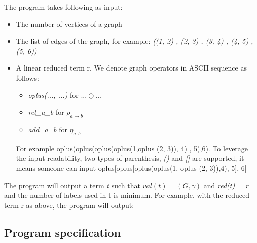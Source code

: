 \documentclass[a4paper, 12pt]{article}
\begin{document}
The program takes following as input: 
\begin{itemize}
\item The number of vertices of a graph
\item The list of edges of the graph, for example: \textit {((1, 2) , (2, 3) , (3, 4) , (4, 5) , (5, 6))}
\item A linear reduced term r. We denote graph operators in ASCII sequence as follows:
\begin{itemize}
\item \textit {oplus(..., ...)} for $...\oplus...$
\item \textit {rel\_a\_b} for $\rho_{a\rightarrow b}$
\item \textit {add\_a\_b} for $\eta_{a,b}$
\end{itemize}

For example\textit { }oplus(oplus(oplus(oplus(1,oplus (2, 3)), 4) , 5),6). To leverage the input readability, two types of parenthesis, \textit {()} and \textit {{[}{]}} are supported, it means someone can input oplus{[}oplus{[}oplus(oplus(1, oplus (2, 3)),4), 5{]}, 6{]}
\end{itemize}

The program will output a term \textit t such that \textit {$val(t)=(G,\gamma)$} and \textit {red(t) = r} and the number of labels used in t is minimum. For example, with the reduced term r as above, the program will output: \textit{}


\subsection{Program specification}
\end{document}
